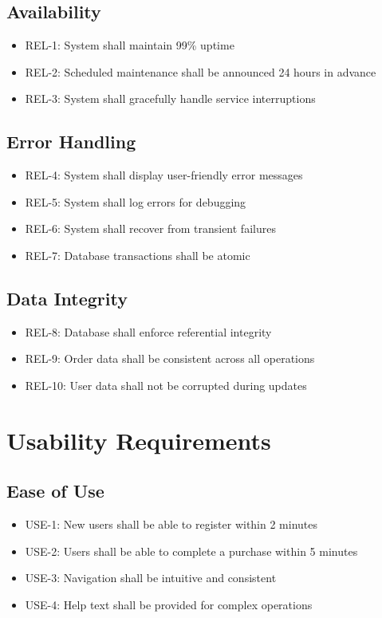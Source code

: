 \documentclass{scrreprt}
\begin{document}
\subsection{Availability}
\begin{itemize}
\item REL-1: System shall maintain 99\% uptime
\item REL-2: Scheduled maintenance shall be announced 24 hours in advance
\item REL-3: System shall gracefully handle service interruptions
\end{itemize}

\subsection{Error Handling}
\begin{itemize}
\item REL-4: System shall display user-friendly error messages
\item REL-5: System shall log errors for debugging
\item REL-6: System shall recover from transient failures
\item REL-7: Database transactions shall be atomic
\end{itemize}

\subsection{Data Integrity}
\begin{itemize}
\item REL-8: Database shall enforce referential integrity
\item REL-9: Order data shall be consistent across all operations
\item REL-10: User data shall not be corrupted during updates
\end{itemize}

\section{Usability Requirements}

\subsection{Ease of Use}
\begin{itemize}
\item USE-1: New users shall be able to register within 2 minutes
\item USE-2: Users shall be able to complete a purchase within 5 minutes
\item USE-3: Navigation shall be intuitive and consistent
\item USE-4: Help text shall be provided for complex operations
\end{itemize}
\end{document}
